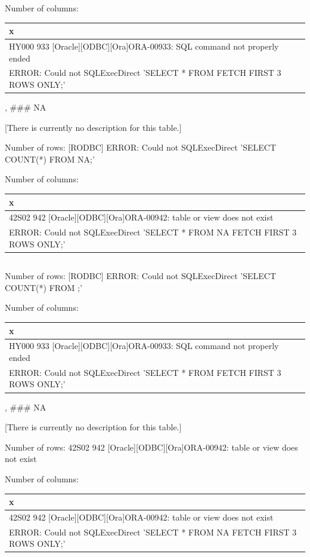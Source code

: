 \documentclass[
  letterpaper,
  oneside,
  open=any]{scrbook}
\begin{document}
Number of columns:

\begin{tabular}{l}
\hline
x\\
\hline
HY000 933 [Oracle][ODBC][Ora]ORA-00933: SQL command not properly ended\\
\hline
[RODBC] ERROR: Could not SQLExecDirect 'SELECT *
    FROM 
    FETCH FIRST 3 ROWS ONLY;'\\
\hline
\end{tabular}

, \#\#\# NA

{[}There is currently no description for this table.{]}

Number of rows: {[}RODBC{]} ERROR: Could not SQLExecDirect 'SELECT
COUNT(*) FROM NA;'

Number of columns:

\begin{tabular}{l}
\hline
x\\
\hline
42S02 942 [Oracle][ODBC][Ora]ORA-00942: table or view does not exist\\
\hline
[RODBC] ERROR: Could not SQLExecDirect 'SELECT *
    FROM NA
    FETCH FIRST 3 ROWS ONLY;'\\
\hline
\end{tabular}

\hypertarget{section-5}{%
\subsection{}\label{section-5}}

Number of rows: {[}RODBC{]} ERROR: Could not SQLExecDirect 'SELECT
COUNT(*) FROM ;'

Number of columns:

\begin{tabular}{l}
\hline
x\\
\hline
HY000 933 [Oracle][ODBC][Ora]ORA-00933: SQL command not properly ended\\
\hline
[RODBC] ERROR: Could not SQLExecDirect 'SELECT *
    FROM 
    FETCH FIRST 3 ROWS ONLY;'\\
\hline
\end{tabular}

, \#\#\# NA

{[}There is currently no description for this table.{]}

Number of rows: 42S02 942 {[}Oracle{]}{[}ODBC{]}{[}Ora{]}ORA-00942:
table or view does not exist

Number of columns:

\begin{tabular}{l}
\hline
x\\
\hline
42S02 942 [Oracle][ODBC][Ora]ORA-00942: table or view does not exist\\
\hline
[RODBC] ERROR: Could not SQLExecDirect 'SELECT *
    FROM NA
    FETCH FIRST 3 ROWS ONLY;'\\
\hline
\end{tabular}
\end{document}
